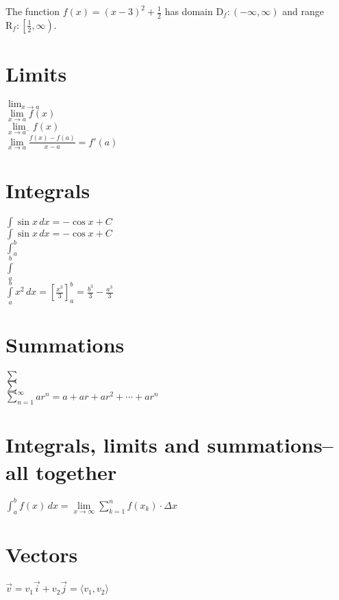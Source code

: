\documentclass[11pt]{article}
\begin{document}
The function $f(x)=(x-3)^2+\frac{1}{2}$ has domain $\mathrm{D}_f:(-\infty, \infty)$ and range $\mathrm{R}_f:\left[\frac{1}{2}, \infty\right)$.\\

\section{Limits}

$\lim_{x \to a}$\\ %

$\lim\limits_{x \to a} f(x)$\\

$\lim\limits_{x \to a^-} f(x)$\\

$\displaystyle{\lim\limits_{x\to a}\frac{f(x)-f(a)}{x-a}=f'(a)}$\\

\section{Integrals}

$\int\sin x\,dx=-\cos x+C$\\

$\displaystyle{\int\sin x\,dx=-\cos x+C}$\\

$\displaystyle{\int_a^b}$\\

$\displaystyle{\int\limits_a^b}$\\

$\displaystyle{\int\limits_{a}^{b}x^2\,dx=\left[\frac{x^3}{3}\right]_{a}^{b}=\frac{b^3}{3}-\frac{a^3}{3}}$\\

\section{Summations}

$\sum$\\

$\displaystyle{\sum}$\\

$\displaystyle{\sum\limits_{n=1}^{\infty}ar^n=a+ar+ar^2+\cdots +ar^n}$\\

\section{Integrals, limits and summations--all together}

$\displaystyle{\int_a^b f(x)\,dx=\lim\limits_{x \to \infty}\sum\limits_{k=1}^{n}f(x_k)\cdot\Delta x}$\\

\section{Vectors}

$\vec{v}=v_1 \vec{i}+v_2 \vec{j}=\langle v_1, v_2 \rangle$
\end{document}
